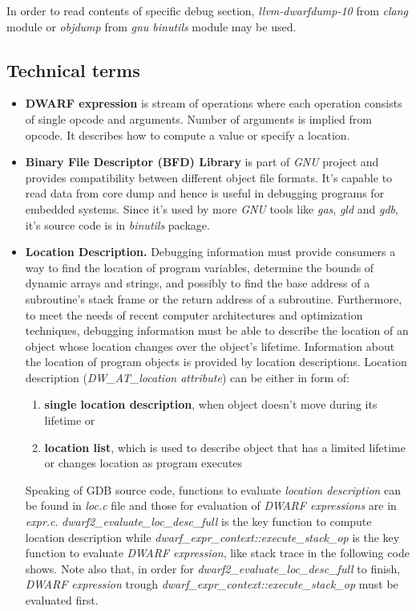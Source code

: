 \documentclass{report}
\begin{document}
	In order to read contents of specific debug section, \textit{llvm-dwarfdump-10} from \textit{clang} module or \textit{objdump} from \textit{gnu binutils} module may be used.

\subsection *{Technical terms}
\begin{itemize}
	\item \textbf{DWARF expression} is stream of operations where each operation consists of single opcode and arguments. Number of arguments is implied from opcode. It describes how to compute a value or specify a location. 
	
	\item \textbf{Binary File Descriptor (BFD) Library} is part of \textit{GNU} project and provides compatibility between different object file formats. It's capable to read data from core dump and hence is useful in debugging programs for embedded systems. Since it's used by more \textit{GNU} tools like \textit{gas}, \textit{gld} and \textit{gdb}, it's source code is in \textit{binutils} package.
	
	\item \textbf{Location Description.} Debugging information must provide consumers a way to find the location of program variables, determine the bounds of dynamic arrays and strings, and possibly to find the base address of a subroutine’s stack frame or the return address of a subroutine. Furthermore, to meet the needs of recent computer architectures and optimization techniques, debugging information must be able to describe the location of an object whose location changes over the object’s lifetime. Information about the location of program objects is provided by location descriptions.
	Location description (\textit{DW\_AT\_location attribute}) can be either in form of: 
	\begin{enumerate}
		\item \textbf{single location description}, when object doesn't move during its lifetime or 
		\item \textbf{location list}, which is used to describe object that has a limited lifetime or changes location as program executes
	\end{enumerate}

	Speaking of GDB source code, functions to evaluate \textit{location description} can be found in \textit{loc.c} file and those for evaluation of \textit{DWARF expressions} are in \textit{expr.c}.  \textit{dwarf2\_evaluate\_loc\_desc\_full} is the key function to compute location description while \textit{dwarf\_expr\_context::execute\_stack\_op} is the key function to evaluate \textit{DWARF expression}, like stack trace in the following code shows. Note also that, in order for \textit{dwarf2\_evaluate\_loc\_desc\_full} to finish, \textit{DWARF expression} trough \textit{dwarf\_expr\_context::execute\_stack\_op} must be evaluated first.
	

\end{itemize}
\end{document}
